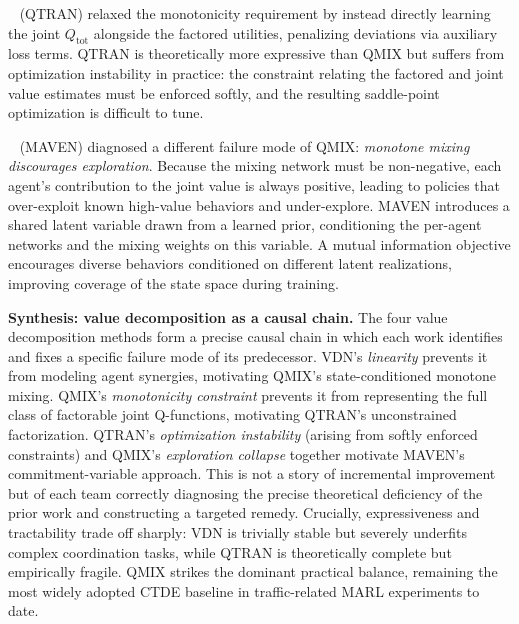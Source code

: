 \documentclass[12pt, a4paper]{article}
\begin{document}
\citeauthor{son2019qtran}~\cite{son2019qtran} (QTRAN) relaxed the monotonicity
requirement by instead directly learning the joint $Q_{\text{tot}}$ alongside
the factored utilities, penalizing deviations via auxiliary loss terms.  QTRAN
is theoretically more expressive than QMIX but suffers from optimization
instability in practice: the constraint relating the factored and joint value
estimates must be enforced softly, and the resulting saddle-point optimization
is difficult to tune.

\citeauthor{mahajan2019maven}~\cite{mahajan2019maven} (MAVEN) diagnosed a
different failure mode of QMIX: \emph{monotone mixing discourages exploration}.
Because the mixing network must be non-negative, each agent's contribution to
the joint value is always positive, leading to policies that over-exploit known
high-value behaviors and under-explore.  MAVEN introduces a shared latent
variable drawn from a learned prior, conditioning the per-agent networks and
the mixing weights on this variable.  A mutual information objective encourages
diverse behaviors conditioned on different latent realizations, improving
coverage of the state space during training.

\smallskip\noindent\textbf{Synthesis: value decomposition as a causal chain.}
The four value decomposition methods form a precise causal chain in which each
work identifies and fixes a specific failure mode of its predecessor.
VDN's \emph{linearity} prevents it from modeling agent synergies, motivating
QMIX's state-conditioned monotone mixing.  QMIX's \emph{monotonicity
constraint} prevents it from representing the full class of factorable joint
Q-functions, motivating QTRAN's unconstrained factorization.  QTRAN's
\emph{optimization instability} (arising from softly enforced constraints)
and QMIX's \emph{exploration collapse} together motivate MAVEN's
commitment-variable approach.  This is not a story of incremental
improvement but of each team correctly diagnosing the precise theoretical
deficiency of the prior work and constructing a targeted remedy.  Crucially,
expressiveness and tractability trade off sharply: VDN is trivially stable
but severely underfits complex coordination tasks, while QTRAN is theoretically
complete but empirically fragile.  QMIX strikes the dominant practical
balance, remaining the most widely adopted CTDE baseline in traffic-related
MARL experiments to date.
\end{document}
